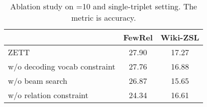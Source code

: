 \begin{table}[t]
    \centering
    \small
    \begin{tabular}{lcc}
    \toprule
         & FewRel & Wiki-ZSL \\\midrule
         ZETT & 27.90 & 17.27 \\
\quad w/o decoding vocab constraint & 27.76 & 16.88 \\
\quad w/o beam search & 26.87 & 15.65 \\
\quad w/o relation constraint & 24.34 & 16.61 \\ \bottomrule
    \end{tabular}
    \caption{Ablation study on =10 and single-triplet setting. The metric is accuracy.}
    \label{tab:ablation}
\end{table}

